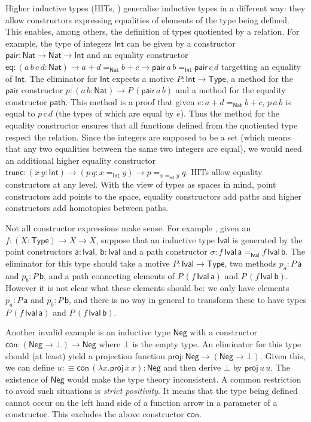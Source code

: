 \documentclass[a4paper,UKenglish]{lipics-v2018}
\newcommand{\ra}{\rightarrow}
\newcommand{\Nat}{\mathsf{Nat}}
\newcommand{\proj}{\mathsf{proj}}
\newcommand{\1}{\mathsf{1}} \renewcommand{\Pr}{\mathsf{Pr}}
\newcommand{\con}{\mathsf{con}}
\newcommand{\Int}{\mathsf{Int}}
\begin{document}
Higher inductive types (HITs, \cite[Chapter 6]{HoTTbook}) generalise
inductive types in a different way: they allow constructors expressing
equalities of elements of the type being defined. This enables, among
others, the definition of types quotiented by a relation. For example,
the type of integers $\Int$ can be given by a constructor
$\mathsf{pair}:\Nat\ra\Nat\ra\Int$ and an equality constructor
$\mathsf{eq}:(a\,b\,c\,d:\Nat)\ra a+d=_\Nat b+c\ra
\mathsf{pair}\,a\,b=_{\Int}\mathsf{pair}\,c\,d$ targetting an equality
of $\Int$. The eliminator for $\Int$ expects a motive
$P:\Int\ra\mathsf{Type}$, a method for the $\mathsf{pair}$ constructor
$p:(a\,b:\Nat)\ra P\,(\mathsf{pair}\,a\,b)$ and a method for the
equality constructor $\mathsf{path}$. This method is a proof that
given $e:a+d=_\Nat b+c$, $p\,a\,b$ is equal to $p\,c\,d$ (the types of
which are equal by $e$). Thus the method for the equality constructor
ensures that all functions defined from the quotiented type respect
the relation. Since the integers are supposed to be a set (which
means that any two equalities between the same two integers are
equal), we would need an additional higher equality constructor
$\mathsf{trunc}:(x\,y:\Int)\ra(p\,q:x=_\Int y)\ra p=_{x=_\Int y} q$.
HITs allow equality constructors at any level. With the view of types
as spaces in mind, point constructors add points to the space,
equality constructors add paths and higher constructors add homotopies
between paths.

Not all constructor expressions make sense. For example \cite[Example
  6.13.1]{HoTTbook}, given an $f:(X:\mathsf{Type})\ra X\ra X$, suppose that an
inductive type $\mathsf{Ival}$ is generated by the point constructors
$\mathsf{a}:\mathsf{Ival}$, $\mathsf{b}:\mathsf{Ival}$ and a path
constructor $\sigma:f\,\mathsf{Ival}\,\mathsf{a}
=_{\mathsf{Ival}}f\,\mathsf{Ival}\,\mathsf{b}$. The eliminator for this type
should take a motive $P:\mathsf{Ival}\ra\mathsf{Type}$, two methods $p_a :
P\,\mathsf{a}$ and $p_b : P\,\mathsf{b}$, and a path connecting
elements of $P\,(f\,\mathsf{Ival}\,\mathsf{a})$ and
$P\,(f\,\mathsf{Ival}\,\mathsf{b})$. However it is not clear what these
elements should be: we only have elements $p_a:P\,\mathsf{a}$ and
$p_b:P\,\mathsf{b}$, and there is no way in general to transform these
to have types $P\,(f\,\mathsf{Ival}\,\mathsf{a})$ and
$P\,(f\,\mathsf{Ival}\,\mathsf{b})$.

Another invalid example is an inductive type $\mathsf{Neg}$ with a
constructor $\con:(\mathsf{Neg} \ra \bot) \ra \mathsf{Neg}$ where $\bot$
is the empty type. An eliminator for this type should (at least) yield
a projection function $\proj: \mathsf{Neg} \ra (\mathsf{Neg} \ra
\bot)$. Given this, we can define $u :\equiv \con\,(\lambda x
. \proj\, x\,x):\mathsf{Neg}$ and then derive $\bot$ by
$\proj\,u\,u$. The existence of $\mathsf{Neg}$ would make the type
theory inconsistent. A common restriction to avoid such situations is
\emph{strict positivity}. It means that the type being defined cannot
occur on the left hand side of a function arrow in a parameter of a
constructor. This excludes the above constructor $\con$.
\end{document}
